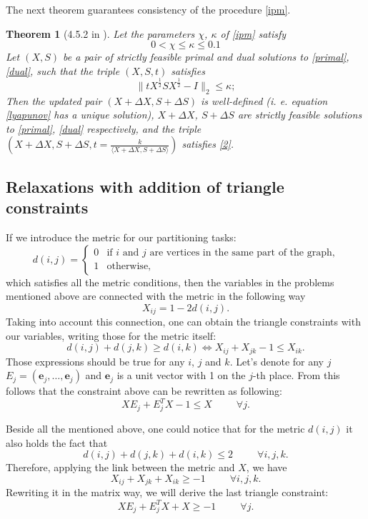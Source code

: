 \documentclass[12pt]{article}
\begin{document}
The next theorem guarantees consistency of the procedure \ref{ipm}.
\newtheorem{Th}{Theorem}
\begin{Th}[4.5.2 in \cite{nemirovski}]
	Let the parameters $\chi$, $\kappa$ of \ref{ipm} satisfy
	\[
		0 < \chi \leq \kappa \leq 0.1
	\]
	Let $(X, S)$ be a pair of strictly feasible primal and dual solutions to \ref{primal}, 
	\ref{dual}, such that the triple $(X, S, t)$ satisfies
	\begin{equation}
	\label{2}
		\| t X^{\frac12} S X^{\frac12} - I \|_2 \leq \kappa;
	\end{equation}
	Then the updated pair $(X + \Delta X, S + \Delta S)$ is well-defined (i. e. equation 
	\ref{lyapunov} has a unique solution), $X + \Delta X$, $S + \Delta S$ are strictly 
	feasible solutions to \ref{primal}, \ref{dual} respectively, and the triple $\left(X + 
	\Delta X, S + \Delta S, t = \frac k{ \langle X + \Delta X, S + \Delta S \rangle } \right)$ 
	satisfies \ref{2}.
\end{Th}



\subsection{Relaxations with addition of triangle constraints}

If we introduce the metric for our partitioning tasks:
\[
d(i,j) = \begin{cases}
0 & \text{if $i$ and $j$ are vertices in the same part of the graph,}\\
1 & \text{otherwise,}
\end{cases}
\]
which satisfies all the metric conditions, then the variables in the problems mentioned 
above are connected with the metric in the following way
\[
X_{ij} = 1 - 2d(i,j).
\]
Taking into account this connection, one can obtain the triangle constraints with our 
variables, writing those for the metric itself:
\[
d(i,j) + d(j, k) \geq d(i,k) \Leftrightarrow X_{ij} + X_{jk} - 1 \leq X_{ik}. 
\]
Those expressions should be true for any $i$, $j$ and $k$. Let's denote for any $j$ $E_j 
= (\mathbf{e}_j, \dots, \mathbf{e}_j)$ and $\mathbf{e}_j$ is a unit vector with 1 on the 
$j$-th place. From this follows that the constraint above can be rewritten as following:
\[
XE_j + E_j^T X - 1 \leq X ~~~~~~~~~~~ \forall j. 
\]

Beside all the mentioned above, one could notice that for the metric $d(i,j)$ it also holds 
the fact that
\[
d(i,j) + d(j,k) + d(i,k) \leq 2 ~~~~~~~~~~~ \forall i, j, k.
\]
Therefore, applying the link between the metric and $X$, we have
\[
X_{ij} + X_{jk} + X_{ik} \geq -1 ~~~~~~~~~~~ \forall i, j, k.
\]
Rewriting it in the matrix way, we will derive the last triangle constraint:
\[
XE_j + E_j^T X + X \geq -1 ~~~~~~~~~~~ \forall j.
\]
\end{document}
